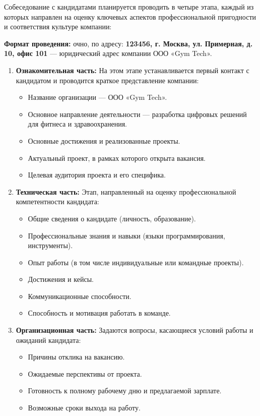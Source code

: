 \documentclass[14pt, russian]{matmex-diploma-custom}
\begin{document}
Собеседование с кандидатами планируется проводить в четыре этапа, каждый из которых направлен на оценку ключевых аспектов профессиональной пригодности и соответствия культуре компании:

\textbf{Формат проведения:} очно, по адресу: \textbf{123456, г. Москва, ул. Примерная, д. 10, офис 101} — юридический адрес компании ООО «Gym Tech».

\begin{enumerate}
    \item \textbf{Ознакомительная часть:}
    На этом этапе устанавливается первый контакт с кандидатом и проводится краткое представление компании:
    \begin{itemize}
        \item Название организации — ООО «Gym Tech».
        \item Основное направление деятельности — разработка цифровых решений для фитнеса и здравоохранения.
        \item Основные достижения и реализованные проекты.
        \item Актуальный проект, в рамках которого открыта вакансия.
        \item Целевая аудитория проекта и его специфика.
    \end{itemize}

    \item \textbf{Техническая часть:}
    Этап, направленный на оценку профессиональной компетентности кандидата:
    \begin{itemize}
        \item Общие сведения о кандидате (личность, образование).
        \item Профессиональные знания и навыки (языки программирования, инструменты).
        \item Опыт работы (в том числе индивидуальные или командные проекты).
        \item Достижения и кейсы.
        \item Коммуникационные способности.
        \item Способность и мотивация работать в команде.
    \end{itemize}

    \item \textbf{Организационная часть:}
    Задаются вопросы, касающиеся условий работы и ожиданий кандидата:
    \begin{itemize}
        \item Причины отклика на вакансию.
        \item Ожидаемые перспективы от проекта.
        \item Готовность к полному рабочему дню и предлагаемой зарплате.
        \item Возможные сроки выхода на работу.
    \end{itemize}


\end{enumerate}
\end{document}
